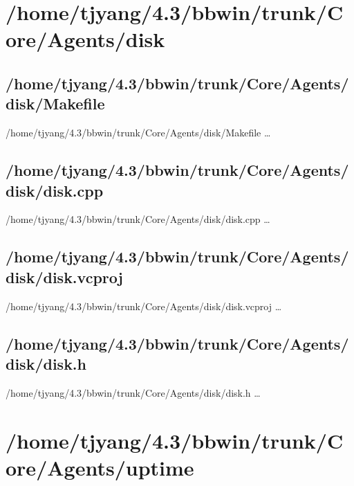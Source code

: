 \section{/home/tjyang/4.3/bbwin/trunk/Core/Agents/disk}
\subsection{/home/tjyang/4.3/bbwin/trunk/Core/Agents/disk/Makefile}
\lstset{numberstyle=\tiny,numbers=left,
   breaklines=true,
   stepnumber=1,numbersep=5pt,firstnumber=1,
   xleftmargin=12pt,showstringspaces=false}
\noindent /home/tjyang/4.3/bbwin/trunk/Core/Agents/disk/Makefile  \ldots


\subsection{/home/tjyang/4.3/bbwin/trunk/Core/Agents/disk/disk.cpp}
\lstset{numberstyle=\tiny,numbers=left,
   breaklines=true,
   stepnumber=1,numbersep=5pt,firstnumber=1,
   xleftmargin=12pt,showstringspaces=false}
\noindent /home/tjyang/4.3/bbwin/trunk/Core/Agents/disk/disk.cpp  \ldots





\subsection{/home/tjyang/4.3/bbwin/trunk/Core/Agents/disk/disk.vcproj}
\lstset{numberstyle=\tiny,numbers=left,
   breaklines=true,
   stepnumber=1,numbersep=5pt,firstnumber=1,
   xleftmargin=12pt,showstringspaces=false}
\noindent /home/tjyang/4.3/bbwin/trunk/Core/Agents/disk/disk.vcproj  \ldots



\subsection{/home/tjyang/4.3/bbwin/trunk/Core/Agents/disk/disk.h}
\lstset{numberstyle=\tiny,numbers=left,
   breaklines=true,
   stepnumber=1,numbersep=5pt,firstnumber=1,
   xleftmargin=12pt,showstringspaces=false}
\noindent /home/tjyang/4.3/bbwin/trunk/Core/Agents/disk/disk.h  \ldots



\section{/home/tjyang/4.3/bbwin/trunk/Core/Agents/uptime}
